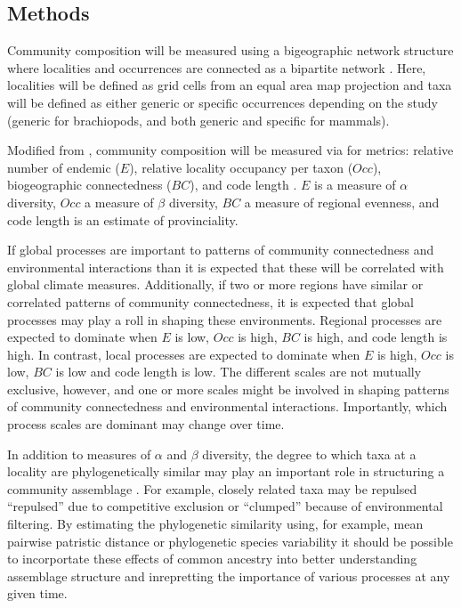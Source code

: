 \documentclass[12pt,letterpaper]{article}
\begin{document}
\subsection{Methods}
Community composition will be measured using a bigeographic network structure where localities and occurrences are connected as a bipartite network \citep{Sidor2013,Vilhena2013,Vilhena2013b}. Here, localities will be defined as grid cells from an equal area map projection and taxa will be defined as either generic or specific occurrences depending on the study (generic for brachiopods, and both generic and specific for mammals). 

Modified from \citet{Sidor2013}, community composition will be measured via for metrics: relative number of endemic (\(E\)), relative locality occupancy per taxon (\(Occ\)), biogeographic connectedness (\(BC\)), and code length \citep{Rosvall2008,Rosvall2009a}. \(E\) is a measure of \(\alpha\) diversity, \(Occ\) a measure of \(\beta\) diversity, \(BC\) a measure of regional evenness, and code length is an estimate of provinciality.

If global processes are important to patterns of community connectedness and environmental interactions than it is expected that these will be correlated with global climate measures. Additionally, if two or more regions have similar or correlated patterns of community connectedness, it is expected that global processes may play a roll in shaping these environments. Regional processes are expected to dominate when \(E\) is low, \(Occ\) is high, \(BC\) is high, and code length is high. In contrast, local processes are expected to dominate when \(E\) is high, \(Occ\) is low, \(BC\) is low and code length is low. The different scales are not mutually exclusive, however, and one or more scales might be involved in shaping patterns of community connectedness and environmental interactions. Importantly, which process scales are dominant may change over time.

In addition to measures of \(\alpha\) and \(\beta\) diversity, the degree to which taxa at a locality are phylogenetically similar may play an important role in structuring a community assemblage \citep{Webb2002}. For example, closely related taxa may be repulsed ``repulsed'' due to competitive exclusion or ``clumped'' because of environmental filtering. By estimating the phylogenetic similarity using, for example, mean pairwise patristic distance \citep{Webb2002} or phylogenetic species variability \citep{Helmus2007a} it should be possible to incorportate these effects of common ancestry into better understanding assemblage structure and inrepretting the importance of various processes at any given time.
\end{document}
